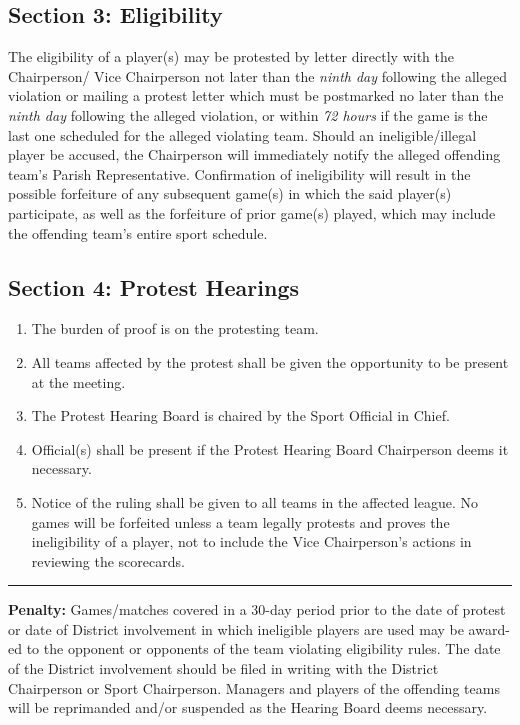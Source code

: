 \documentclass[letteraper,10pt,oneside,draft]{memoir}
\begin{document}
\subsection{Section 3: Eligibility}
\label{ssec:const-7-3}
The eligibility of a player(s) may be protested by letter directly with the Chairperson/ Vice Chairperson not later than the {\em ninth day} following the alleged violation or mailing a protest letter which must be postmarked no later than the {\em ninth day} following the alleged violation, or within {\em 72 hours} if the game is the last one scheduled for the alleged violating team.  Should an ineligible/illegal player be accused, the Chairperson will immediately notify the alleged offending team’s Parish Representative. Confirmation of ineligibility will result in the possible forfeiture of any subsequent game(s) in which the said player(s) participate, as well as the forfeiture of prior game(s) played, which may include the offending team’s entire sport schedule.

\subsection{Section 4: Protest Hearings}
\label{ssec:const-7-4}
\begin{enumerate}[1.]
    \item The burden of proof is on the protesting team.
    \item All teams affected by the protest shall be given the opportunity to be present at the meeting.
    \item The Protest Hearing Board is chaired by the Sport Official in Chief.
    \item Official(s) shall be present if the Protest Hearing Board Chairperson deems it necessary.
    \item Notice of the ruling shall be given to all teams in the affected league.  No games will be forfeited unless a team legally protests and proves the ineligibility of a player, not to include the Vice Chairperson’s actions in reviewing the scorecards.
\end{enumerate}
\plainbreak{1}
\textbf{Penalty:} Games/matches covered in a 30-day period prior to the date of protest or date of District involvement in which ineligible players are used may be award-ed to the opponent or opponents of the team violating eligibility rules. The date of the District involvement should be filed in writing with the District Chairperson or Sport Chairperson. Managers and players of the offending teams will be reprimanded and/or suspended as the Hearing Board deems necessary.
\end{document}
